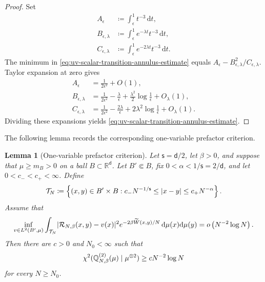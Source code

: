 \documentclass[11pt,reqno]{amsart}
\numberwithin{equation}{section}
\theoremstyle{plain}
\newtheorem{lemma}[lemma]{Lemma}
\theoremstyle{remark}
\DeclarePairedDelimiter{\pa}{\lparen}{\rparen}
\DeclarePairedDelimiter{\abs}{\lvert}{\rvert}
\renewcommand{\d}{\mathsf{d}}
\newcommand{\md}{\mathrm{d}}
\newcommand{\R}{{\mathbb{R}}}
\newcommand{\Q}{{\mathbb{Q}}}
\newcommand{\tl}{\widetilde}
\newcommand{\be}{\beta}
\newcommand{\s}{\mathsf{s}}
\newcommand{\Chi}{\chi^2}
\begin{document}
\begin{proof}
Set
\begin{align}
 A_\epsilon&\coloneqq\int_\epsilon^1t^{-3}\,\md t,
 \label{eq:uv-scalar-A-def}\\
 B_{\epsilon,\lambda}&\coloneqq\int_\epsilon^1e^{-\lambda t}t^{-3}\,\md t,
 \label{eq:uv-scalar-B-def}\\
 C_{\epsilon,\lambda}&\coloneqq\int_\epsilon^1e^{-2\lambda t}t^{-3}\,\md t.
 \label{eq:uv-scalar-C-def}
\end{align}
The minimum in \eqref{eq:uv-scalar-transition-annulus-estimate} equals \(A_\epsilon-B_{\epsilon,\lambda}^2/C_{\epsilon,\lambda}\).  Taylor expansion at zero gives
\begin{align}
 A_\epsilon&=\frac1{2\epsilon^2}+O(1),
 \label{eq:uv-scalar-A-expansion}\\
 B_{\epsilon,\lambda}&=\frac1{2\epsilon^2}-\frac\lambda\epsilon
 +\frac{\lambda^2}{2}\log\frac1\epsilon+O_\lambda(1),
 \label{eq:uv-scalar-B-expansion}\\
 C_{\epsilon,\lambda}&=\frac1{2\epsilon^2}-\frac{2\lambda}\epsilon
 +2\lambda^2\log\frac1\epsilon+O_\lambda(1).
 \label{eq:uv-scalar-C-expansion}
\end{align}
Dividing these expansions yields \eqref{eq:uv-scalar-transition-annulus-estimate}.
\end{proof}

The following lemma records the corresponding one-variable prefactor criterion.

\begin{lemma}[One-variable prefactor criterion]
\label{lem:uv-critical-one-variable-criterion}
Let \(\s=\d/2\), let \(\be>0\), and suppose that \(\mu\ge m_B>0\) on a ball \(B\subset\R^\d\).  Let \(B'\Subset B\), fix \(0<\alpha<1/\s=2/\d\), and let \(0<c_-<c_+<\infty\).  Define
\begin{align}\label{eq:uv-critical-annulus-def}
 \mathcal T_N
 \coloneqq
 \left\{(x,y)\in B'\times B:
 c_-N^{-1/\s}\le\abs{x-y}\le c_+N^{-\alpha}\right\}.
\end{align}
Assume that
\begin{align}\label{eq:uv-one-variable-prefactor-assumption}
 \inf_{v\in L^2(B',\mu)}
 \int_{\mathcal T_N}
 \abs{\mathcal R_{N,\be}(x,y)-v(x)}^2
 e^{-2\be\tl W(x,y)/N}\,\md\mu(x)\md\mu(y)
 =o\left(N^{-2}\log N\right).
\end{align}
Then there are \(c>0\) and \(N_0<\infty\) such that
\begin{align}\label{eq:uv-critical-criterion-conclusion}
 \Chi\pa{\Q_{N,\be}^{(2)}(\mu)\mid\mu^{\otimes2}}
 \ge cN^{-2}\log N
\end{align}
for every \(N\ge N_0\).
\end{lemma}
\end{document}
